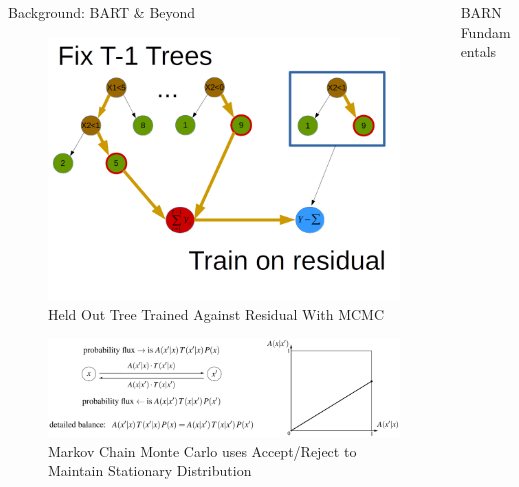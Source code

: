 \documentclass{beamer}
\newlength{\columnheight}
\begin{document}
\begin{frame}
\begin{columns}
\begin{column}{.33\textwidth}
\begin{minipage}{.98\textwidth}
{\begin{myblock}{Background: BART \& Beyond}
\begin{figure}[h]
\includegraphics[scale=0.8]{pres_bart.png}
\caption{Held Out Tree Trained Against Residual With MCMC \cite{chipman2010bart}}
\end{figure}
\begin{figure}[h]
\includegraphics{balance.png}
\caption{Markov Chain Monte Carlo uses Accept/Reject to Maintain Stationary Distribution\cite{stepanov2021math}}
\end{figure}
		\end{myblock}
	}
	\end{minipage}
	\end{column}
	\begin{column}{.33\textwidth}
	\begin{minipage}{.98\textwidth}  %
		\parbox[t][\columnheight]{\textwidth}{ %
			\begin{myblock}{BARN Fundamentals}


\end{myblock}}
\end{minipage}
\end{column}
\end{columns}
\end{frame}
\end{document}
